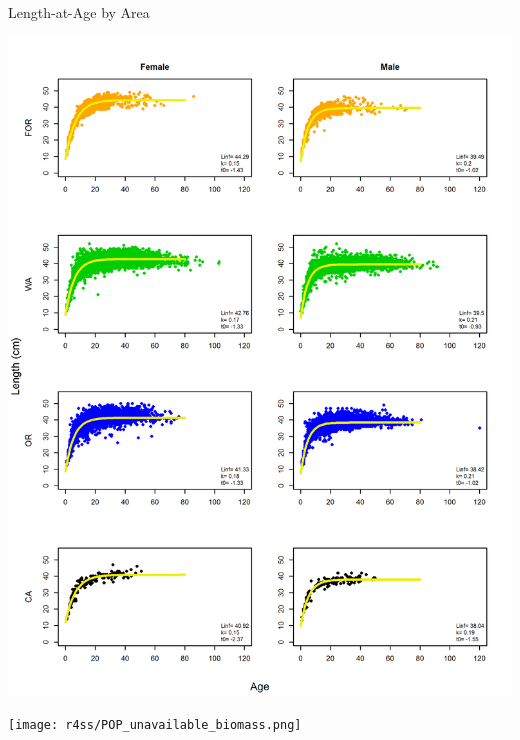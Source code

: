 \documentclass[pdf]{beamer}\usepackage[]{graphicx}\usepackage[]{color}
\begin{document}
\begin{frame}{Length-at-Age by Area}
  \begin{center}
  \includegraphics[scale = 0.35]{figures/LengthAge_StateEach_wCanada.png}
  \end{center}
\end{frame}

\begin{frame}
  \begin{center}
    \texttt{[image: r4ss/POP\_unavailable\_biomass.png]}
  \end{center}
\end{frame}


  
\end{document}
